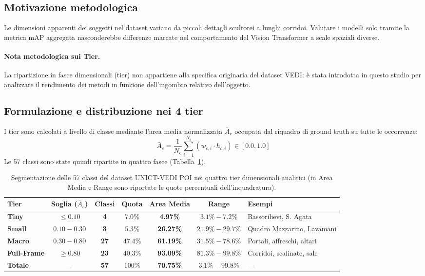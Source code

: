 \subsection{Motivazione metodologica}
Le dimensioni apparenti dei soggetti nel dataset variano da piccoli dettagli scultorei a lunghi corridoi. Valutare i modelli solo tramite la metrica mAP aggregata nasconderebbe differenze marcate nel comportamento del Vision Transformer a scale spaziali diverse.

\paragraph{Nota metodologica sui Tier.}
La ripartizione in fasce dimensionali (tier) non appartiene alla specifica originaria del dataset VEDI: è stata introdotta in questo studio per analizzare il rendimento dei metodi in funzione dell'ingombro relativo dell'oggetto.

\subsection{Formulazione e distribuzione nei 4 tier}
I tier sono calcolati a livello di classe mediante l'area media normalizzata $\bar{A}_c$ occupata dal riquadro di ground truth su tutte le occorrenze:
\begin{equation}
    \bar{A}_c = \frac{1}{N_c} \sum_{i=1}^{N_c} (w_{c,i} \cdot h_{c,i}) \in [0.0, 1.0]
\end{equation}
Le 57 classi sono state quindi ripartite in quattro fasce (Tabella~\ref{tab:distribuzione_tiers}).

\begin{table}[htbp]
\centering
\footnotesize
\setlength{\tabcolsep}{3.5pt}
\begin{tabularx}{\textwidth}{lcccccX}
\toprule
\textbf{Tier} & \textbf{Soglia ($\bar{A}_c$)} & \textbf{Classi} & \textbf{Quota} & \textbf{Area Media} & \textbf{Range} & \textbf{Esempi} \\
\midrule
\textbf{Tiny} & $\le 0.10$ & \textbf{4} & $7.0\%$ & \textbf{4.97\%} & $3.1\% - 7.2\%$ & Bassorilievi, S. Agata \\
\textbf{Small} & $0.10 - 0.30$ & \textbf{3} & $5.3\%$ & \textbf{26.27\%} & $21.9\% - 29.7\%$ & Quadro Mazzarino, Lavamani \\
\textbf{Macro} & $0.30 - 0.80$ & \textbf{27} & $47.4\%$ & \textbf{61.19\%} & $31.5\% - 78.6\%$ & Portali, affreschi, altari \\
\textbf{Full-Frame} & $\ge 0.80$ & \textbf{23} & $40.3\%$ & \textbf{93.09\%} & $81.3\% - 99.8\%$ & Corridoi, scalinate, sale \\
\midrule
\textbf{Totale} & — & \textbf{57} & $100\%$ & \textbf{70.75\%} & $3.1\% - 99.8\%$ & — \\
\bottomrule
\end{tabularx}
\caption{Segmentazione delle 57 classi del dataset UNICT-VEDI POI nei quattro tier dimensionali analitici (in Area Media e Range sono riportate le quote percentuali dell'inquadratura).}
\label{tab:distribuzione_tiers}
\end{table}

